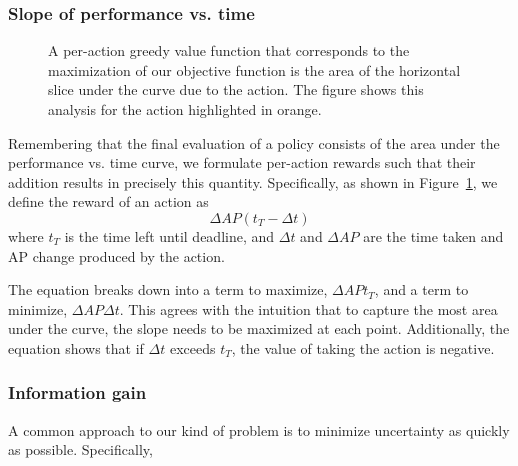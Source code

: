 \documentclass[runningheads]{llncs}
\begin{document}
\subsubsection{Slope of performance vs. time}
\begin{figure}[htb]
  \caption{\label{fig:rewards}A per-action greedy value function that corresponds to the maximization of our objective function is the area of the horizontal slice under the curve due to the action. The figure shows this analysis for the action highlighted in orange.}
\end{figure}

Remembering that the final evaluation of a policy consists of the area under the performance vs. time curve, we formulate per-action rewards such that their addition results in precisely this quantity.
Specifically, as shown in Figure~\ref{fig:rewards}, we define the reward of an action as
\begin{equation}\label{eq:advanced}
\Delta AP (t_T-\Delta t)
\end{equation}
where $t_T$ is the time left until deadline, and $\Delta t$ and $\Delta AP$ are the time taken and AP change produced by the action.

The equation breaks down into a term to maximize, $\Delta AP t_T$, and a term to minimize, $\Delta AP \Delta t$.
This agrees with the intuition that to capture the most area under the curve, the slope needs to be maximized at each point.
Additionally, the equation shows that if $\Delta t$ exceeds $t_T$, the value of taking the action is negative.

\subsubsection{Information gain}
A common approach to our kind of problem is to minimize uncertainty as quickly as possible.
Specifically, 
\end{document}
